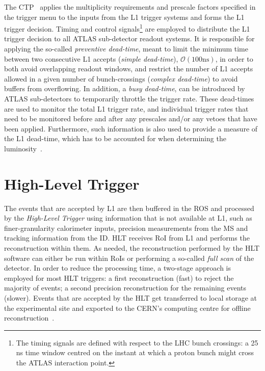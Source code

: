 			The \ac{CTP}~\cite{ATLASJINST} applies the multiplicity requirements and prescale factors specified in the trigger menu to the inputs from the \ac{L1} trigger systems and forms the \ac{L1} trigger decision. Timing and control signals\footnote{The timing signals are defined with respect to the \ac{LHC} bunch crossings: a 25 ns time window centred on the instant at which a proton bunch might cross the \ac{ATLAS} interaction point.} are employed to distribute the \ac{L1} trigger decision to all \ac{ATLAS} sub-detector readout systems. It is responsible for applying the so-called \emph{preventive dead-time}, meant to limit the minimum time between two consecutive \ac{L1} accepts (\emph{simple dead-time}), $\mathcal{O}(100 \mathrm{ns})$, in order to both avoid overlapping readout windows, and restrict the number of \ac{L1} accepts allowed in a given number of bunch-crossings (\emph{complex dead-time}) to avoid buffers from overflowing. In addition, a \emph{busy dead-time}, can be introduced by \ac{ATLAS} sub-detectors to temporarily throttle the trigger rate. These dead-times are used to monitor the total \ac{L1} trigger rate, and individual trigger rates that need to be monitored before and after any prescales and/or any vetoes that have been applied. Furthermore, such information is also used to provide a measure of the \ac{L1} dead-time, which has to be accounted for when determining the luminosity~\cite{ATLASTrigger2010}.

		

			


	\section{High-Level Trigger}
	\label{sec:HLT}

		The events that are accepted by \ac{L1} are then buffered in the \ac{ROS} and processed by the \emph{High-Level Trigger} using information that is not available at \ac{L1}, such as finer-granularity calorimeter inputs, precision measurements from the \ac{MS} and tracking information from the \ac{ID}. \ac{HLT} receives \ac{RoI} from \ac{L1} and performs the reconstruction within them. As needed, the reconstruction performed by the \ac{HLT} software can either be run within \ac{RoI}s or performing a so-called \emph{full scan} of the detector. In order to reduce the processing time, a two-stage approach is employed for most \ac{HLT} triggers: a first reconstruction (fast) to reject the majority of events; a second precision reconstruction for the remaining events (slower). Events that are accepted by the \ac{HLT} get transferred to local storage at the experimental site and exported to the CERN’s computing centre for offline reconstruction~\cite{ATLASTrigger2015}. 

